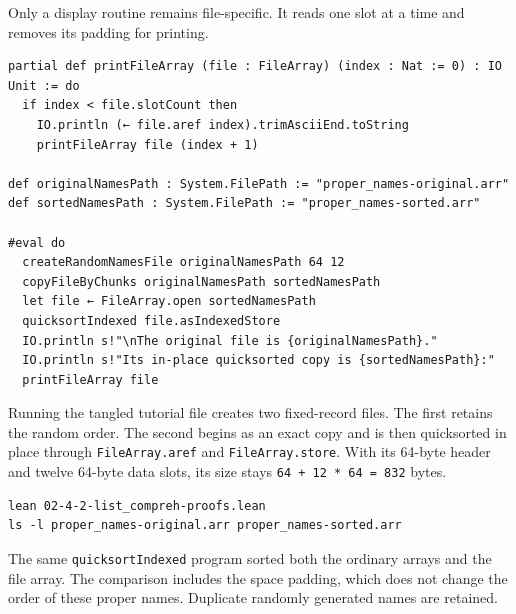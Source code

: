 \documentclass[11pt]{article}
\begin{document}
Only a display routine remains file-specific.  It reads one slot at a time and
removes its padding for printing.

\begin{verbatim}
partial def printFileArray (file : FileArray) (index : Nat := 0) : IO Unit := do
  if index < file.slotCount then
    IO.println (← file.aref index).trimAsciiEnd.toString
    printFileArray file (index + 1)

def originalNamesPath : System.FilePath := "proper_names-original.arr"
def sortedNamesPath : System.FilePath := "proper_names-sorted.arr"

#eval do
  createRandomNamesFile originalNamesPath 64 12
  copyFileByChunks originalNamesPath sortedNamesPath
  let file ← FileArray.open sortedNamesPath
  quicksortIndexed file.asIndexedStore
  IO.println s!"\nThe original file is {originalNamesPath}."
  IO.println s!"Its in-place quicksorted copy is {sortedNamesPath}:"
  printFileArray file
\end{verbatim}

Running the tangled tutorial file creates two fixed-record files.  The first
retains the random order.  The second begins as an exact copy and is then
quicksorted in place through \texttt{FileArray.aref} and \texttt{FileArray.store}.  With its
64-byte header and twelve 64-byte data slots, its size stays
\texttt{64 + 12 * 64 = 832} bytes.

\begin{verbatim}
lean 02-4-2-list_compreh-proofs.lean
ls -l proper_names-original.arr proper_names-sorted.arr
\end{verbatim}

The same \texttt{quicksortIndexed} program sorted both the ordinary arrays and the
file array.  The comparison includes the space padding, which does not change
the order of these proper names.  Duplicate randomly generated names are
retained.
\end{document}
